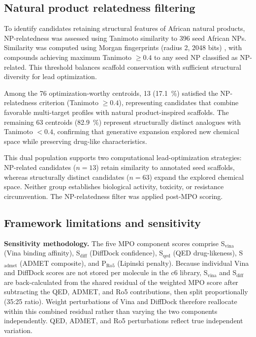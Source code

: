 \documentclass[journal=jcisd8,manuscript=suppinfo]{achemso}
\begin{document}
\subsection*{Natural product relatedness filtering}

To identify candidates retaining structural features of African natural products, NP-relatedness was assessed using Tanimoto similarity to \num{396} seed African NPs. Similarity was computed using Morgan fingerprints (radius \num{2}, \num{2048} bits) \cite{Rogers2010}, with compounds achieving maximum Tanimoto $\geq \num{0.4}$ to any seed NP classified as NP-related. This threshold balances scaffold conservation with sufficient structural diversity for lead optimization.

Among the \num{76} optimization-worthy centroids, \num{13} (\qty{17.1}{\percent}) satisfied the NP-relatedness criterion (Tanimoto $\geq \num{0.4}$), representing candidates that combine favorable multi-target profiles with natural product-inspired scaffolds. The remaining \num{63} centroids (\qty{82.9}{\percent}) represent structurally distinct analogues with Tanimoto $< \num{0.4}$, confirming that generative expansion explored new chemical space while preserving drug-like characteristics.

This dual population supports two computational lead-optimization strategies: NP-related candidates ($n = \num{13}$) retain similarity to annotated seed scaffolds, whereas structurally distinct candidates ($n = \num{63}$) expand the explored chemical space. Neither group establishes biological activity, toxicity, or resistance circumvention. The NP-relatedness filter was applied post-MPO scoring.

\subsection*{Framework limitations and sensitivity}

\label{sec:mpo_sensitivity_methods}

\textbf{Sensitivity methodology.} The five MPO component scores comprise S$_{\text{vina}}$ (Vina binding affinity), S$_{\text{diff}}$ (DiffDock confidence), S$_{\text{qed}}$ (QED drug-likeness), S$_{\text{admet}}$ (ADMET composite), and P$_{\text{Ro5}}$ (Lipinski penalty). Because individual Vina and DiffDock scores are not stored per molecule in the c6 library, S$_{\text{vina}}$ and S$_{\text{diff}}$ are back-calculated from the shared residual of the weighted MPO score after subtracting the QED, ADMET, and Ro5 contributions, then split proportionally (35:25 ratio). Weight perturbations of Vina and DiffDock therefore reallocate within this combined residual rather than varying the two components independently. QED, ADMET, and Ro5 perturbations reflect true independent variation.
\end{document}
